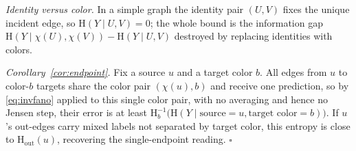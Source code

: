 \documentclass[sigconf, review, anonymous]{acmart}
\newcommand{\Hh}{\mathrm{H}}
\newcommand{\outdeg}{\mathrm{out}}
\theoremstyle{plain}
\theoremstyle{definition}
\begin{document}
\emph{Identity versus color.} In a simple graph the identity pair $(U,V)$ fixes the unique incident edge, so $\Hh(Y\mid U,V)=0$; the whole bound is the information gap $\Hh(Y\mid \chi(U),\chi(V))-\Hh(Y\mid U,V)$ destroyed by replacing identities with colors. 

\emph{Corollary~\ref{cor:endpoint}.} Fix a source $u$ and a target color $b$. All edges from $u$ to color-$b$ targets share the color pair $(\chi(u),b)$ and receive one prediction, so by \eqref{eq:invfano} applied to this single color pair, with no averaging and hence no Jensen step, their error is at least $\Hh_b^{-1}\big(\Hh(Y\mid \text{source}{=}u,\text{target color}{=}b)\big)$. If $u$'s out-edges carry mixed labels not separated by target color, this entropy is close to $\Hh_\outdeg(u)$, recovering the single-endpoint reading. $\square$
\end{document}
